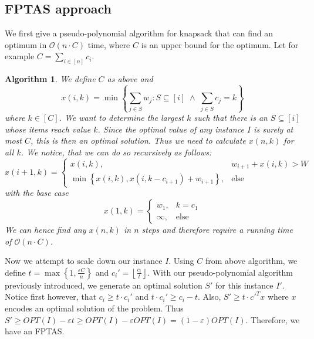 \documentclass[a4paper, 12pt]{article}
\newtheorem{alg}{Algorithm}[section]
\begin{document}
	\subsection{FPTAS approach}
	We first give a pseudo-polynomial algorithm for knapsack that can find an optimum in $\mathcal{O}(n \cdot C)$ time, where $C$ is an upper bound for the optimum. Let for example $C = \sum_{i \in [n]} c_i$. \begin{alg}
		We define $C$ as above and \[x(i,k) = \min \left\{\sum_{j \in S} w_j : S\subseteq [i] \; \land \; \sum_{j \in S} c_j = k\right\}\]
		where $k \in [C]$. We want to determine the largest $k$ such that there is an $S \subseteq [i]$ whose items reach value $k$. Since the optimal value of any instance $I$ is surely at most $C$, this is then an optimal solution. Thus we need to calculate $x(n,k)$ for all $k$. We notice, that we can do so recursively as follows: \[x(i+1,k) = \begin{cases}
			x(i,k), & w_{i+1} + x(i,k) > W\\
			\min\left\{x(i,k), x(i,k-c_{i+1}) + w_{i+1}\right\}, & \text{else} 
		\end{cases}\]
	with the base case \[x(1,k) = \begin{cases}
		w_1, & k = c_1\\
		\infty, & \text{else}
	\end{cases}\]
	We can hence find any $x(n,k)$ in $n$ steps and therefore require a running time of $\mathcal{O}(n\cdot C)$.
	\end{alg}
	Now we attempt to scale down our instance $I$. Using $C$ from above algorithm, we define $t = \max\left\{1, \frac{\varepsilon C}{n}\right\}$ and $c_i' = \left\lfloor \frac{c_i}{t}\right\rfloor$. With our pseudo-polynomial algorithm previously introduced, we generate an optimal solution $S'$ for this instance $I'$. Notice first however, that $c_i \geq t \cdot c_i'$ and $t \cdot c_i' \geq c_i - t$. Also, $S' \geq t\cdot c'^Tx$ where $x$ encodes an optimal solution of the problem. Thus $S' \geq OPT(I) - \varepsilon t \geq OPT(I) - \varepsilon OPT(I) = (1-\varepsilon) OPT(I)$. Therefore, we have an FPTAS.
\end{document}

